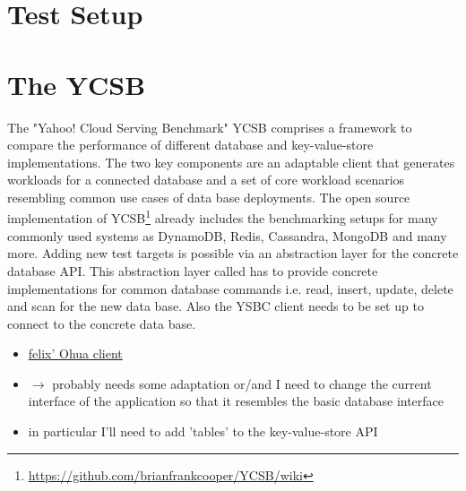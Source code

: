 \section{Test Setup}
\section{The YCSB}

The "Yahoo! Cloud Serving Benchmark" YCSB \cite{YSBC} comprises a framework to compare the performance of different database and key-value-store implementations. The two key components are an adaptable client that generates workloads for a connected database and a set of core workload scenarios resembling common use cases of data base deployments. The open source implementation of YCSB\footnote{\url{https://github.com/brianfrankcooper/YCSB/wiki}} already includes the benchmarking setups for many commonly used systems as DynamoDB, Redis, Cassandra, MongoDB and many more. Adding new test targets is possible via an abstraction layer for the concrete database API. This abstraction layer called  has to provide concrete implementations for common database commands i.e. read, insert, update, delete and scan for the new data base. Also the YSBC client needs to be set up to connect to the concrete data base. \\



\begin{itemize}
    \item \href{https://github.com/Feliix42/YCSB/blob/master/ohua/src/main/java/site/ycsb/db/OhuaClient.java}{felix' Ohua client}
    \item  $\rightarrow$ probably needs some adaptation or/and I need to change the current interface of the application so that it resembles the basic database interface
    \item in particular I'll need to add 'tables' to the key-value-store API
\end{itemize}